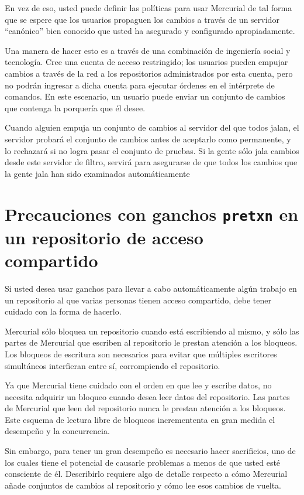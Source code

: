 En vez de eso, usted puede definir las políticas para usar Mercurial
de tal forma que se espere que los usuarios propaguen los cambios a
través de un servidor ``canónico'' bien conocido que usted ha
asegurado y configurado apropiadamente.

Una manera de hacer esto es a través de una combinación de ingeniería
social y tecnología. Cree una cuenta de acceso restringido; los
usuarios pueden empujar cambios a través de la red a los repositorios
administrados por esta cuenta, pero no podrán ingresar a dicha cuenta
para ejecutar órdenes en el intérprete de comandos. En este escenario,
un usuario puede enviar un conjunto de cambios que contenga la
porquería que él desee.

Cuando alguien empuja un conjunto de cambios al servidor del que todos
jalan, el servidor probará el conjunto de cambios antes de aceptarlo
como permanente, y lo rechazará si no logra pasar el conjunto de
pruebas. Si la gente sólo jala cambios desde este servidor de filtro,
servirá para asegurarse de que todos los cambios que la gente jala han
sido examinados automáticamente

\section{Precauciones con ganchos \texttt{pretxn} en un repositorio de
acceso compartido}

Si usted desea usar ganchos para llevar a cabo automáticamente algún
trabajo en un repositorio al que varias personas tienen acceso
compartido, debe tener cuidado con la forma de hacerlo.

Mercurial sólo bloquea un repositorio cuando está escribiendo al
mismo, y sólo las partes de Mercurial que escriben al repositorio le
prestan atención a los bloqueos. Los bloqueos de escritura son
necesarios para evitar que múltiples escritores simultáneos
interfieran entre sí, corrompiendo el repositorio.

Ya que Mercurial tiene cuidado con el orden en que lee y escribe
datos, no necesita adquirir un bloqueo cuando desea leer datos del
repositorio. Las partes de Mercurial que leen del repositorio nunca le
prestan atención a los bloqueos. Este esquema de lectura libre de
bloqueos incremententa en gran medida el desempeño y la concurrencia.

Sin embargo, para tener un gran desempeño es necesario hacer
sacrificios, uno de los cuales tiene el potencial de causarle
problemas a menos de que usted esté consciente de él. Describirlo
requiere algo de detalle respecto a cómo Mercurial añade conjuntos de
cambios al repositorio y cómo lee esos cambios de vuelta.

